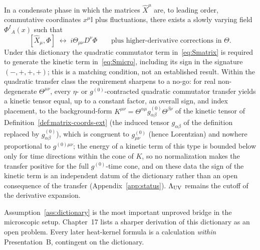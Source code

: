 \begin{assumption}
  \label{ass:dictionary}
  In a condensate phase in which the matrices \(\hat X^\mu\) are,
  to leading order, commutative coordinates \(x^\mu\mathbb{I}\) plus
  fluctuations, there exists a slowly varying field
  \(\Phi^I{}_A(x)\) such that
  \begin{equation}
    \label{eq:dictionary}
    [\hat X_\mu,\Phi]
    \;\longleftrightarrow\;
    i\Theta_{\mu\nu}D^\nu\Phi
    \qquad\text{plus higher-derivative corrections in \(\Theta\).}
  \end{equation}
  Under this dictionary the quadratic commutator term
  in~\eqref{eq:Smatrix} is required to generate the kinetic term
  in~\eqref{eq:Smicro}, including its sign in the signature
  \((-,+,+,+)\); this is a matching condition, not an established result.
Within the quadratic transfer class the requirement sharpens to a no-go: for real non-degenerate \(\Theta^{\mu\nu}\), every \(\eta\)- or \(g^{(0)}\)-contracted quadratic commutator transfer yields a kinetic tensor equal, up to a constant factor, an overall sign, and index placement, to the background-form \(K^{\mu\nu}=\Theta^{\alpha\mu}g^{(0)}_{\alpha\beta}\Theta^{\beta\nu}\) of the kinetic tensor of Definition~\ref{def:matrix-coords-ext} (the induced tensor \(g_{\alpha\beta}\) of the definition replaced by \(g^{(0)}_{\alpha\beta}\)), which is congruent to \(g^{(0)}_{\mu\nu}\) (hence Lorentzian) and nowhere proportional to \(g^{(0)\mu\nu}\); the energy of a kinetic term of this type is bounded below only for time directions within the cone of \(K\), so no normalization makes the transfer positive for the full \(g^{(0)}\)-time cone, and on these data the sign of the kinetic term is an independent datum of the dictionary rather than an open consequence of the transfer (Appendix~\ref{app:status}).
  \(\Lambda_{\mathrm{UV}}\) remains the cutoff of the derivative expansion.
\end{assumption}

Assumption~\ref{ass:dictionary} is the most important unproved bridge
in the microscopic setup. Chapter~17 lists a sharper derivation of
this dictionary as an open problem. Every later heat-kernel formula
is a calculation \emph{within} Presentation~B, contingent on the
dictionary.


